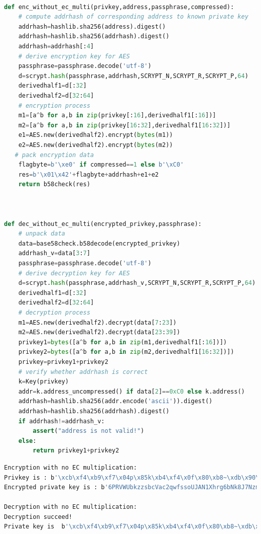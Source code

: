 \begin{lstlisting}[language=python, caption = Encryption \& Decryption with no EC multiplication,
 label=lst-baddersig]

def enc_without_ec_multi(privkey,address,passphrase,compressed):
	# compute addrhash of corresponding address to known private key
	addrhash=hashlib.sha256(address).digest()
	addrhash=hashlib.sha256(addrhash).digest()
	addrhash=addrhash[:4]
	# derive encryption key for AES
	passphrase=passphrase.decode('utf-8')
	d=scrypt.hash(passphrase,addrhash,SCRYPT_N,SCRYPT_R,SCRYPT_P,64)
	derivedhalf1=d[:32]
	derivedhalf2=d[32:64]
	# encryption process
	m1=[a^b for a,b in zip(privkey[:16],derivedhalf1[:16])]
	m2=[a^b for a,b in zip(privkey[16:32],derivedhalf1[16:32])]
	e1=AES.new(derivedhalf2).encrypt(bytes(m1))
	e2=AES.new(derivedhalf2).encrypt(bytes(m2))
   # pack encryption data
	flagbyte=b'\xe0' if compressed==1 else b'\xC0'
	res=b'\x01\x42'+flagbyte+addrhash+e1+e2
	return b58check(res)



def dec_without_ec_multi(encrypted_privkey,passphrase):
	# unpack data 
	data=base58check.b58decode(encrypted_privkey)
	addrhash_v=data[3:7]
	passphrase=passphrase.decode('utf-8')
	# derive decryption key for AES
	d=scrypt.hash(passphrase,addrhash_v,SCRYPT_N,SCRYPT_R,SCRYPT_P,64)
	derivedhalf1=d[:32]
	derivedhalf2=d[32:64]
	# decryption process
	m1=AES.new(derivedhalf2).decrypt(data[7:23])
	m2=AES.new(derivedhalf2).decrypt(data[23:39])
	privkey1=bytes([a^b for a,b in zip(m1,derivedhalf1[:16])])
	privkey2=bytes([a^b for a,b in zip(m2,derivedhalf1[16:32])])
	privkey=privkey1+privkey2
	# verify whether addrhash is correct
	k=Key(privkey)
	addr=k.address_uncompressed() if data[2]==0xC0 else k.address()
	addrhash=hashlib.sha256(addr.encode('ascii')).digest()
	addrhash=hashlib.sha256(addrhash).digest()
	if addrhash!=addrhash_v:
		assert("address is not valid!")
	else:
		return privkey1+privkey2
\end{lstlisting}

\begin{lstlisting}[language=bash, caption = 测试结果 label=lst-baddersig]
Encryption with no EC multiplication:
Privkey is : b'\xcb\xf4\xb9\xf7\x04p\x85k\xb4\xf4\x0f\x80\xb8~\xdb\x90\x86Y\x97\xff\xeem\xf3\x15\xab\x16mq:\xf43\xa5'
Encrypted private key is : b'6PRVWUbkzzsbcVac2qwfssoUJAN1Xhrg6bNk8J7Nzm5H7kxEbn2Nh2ZoGg'

Decryption with no EC multiplication:
Decryption succeed!
Private key is  b'\xcb\xf4\xb9\xf7\x04p\x85k\xb4\xf4\x0f\x80\xb8~\xdb\x90\x86Y\x97\xff\xeem\xf3\x15\xab\x16mq:\xf43\xa5'
\end{lstlisting}

